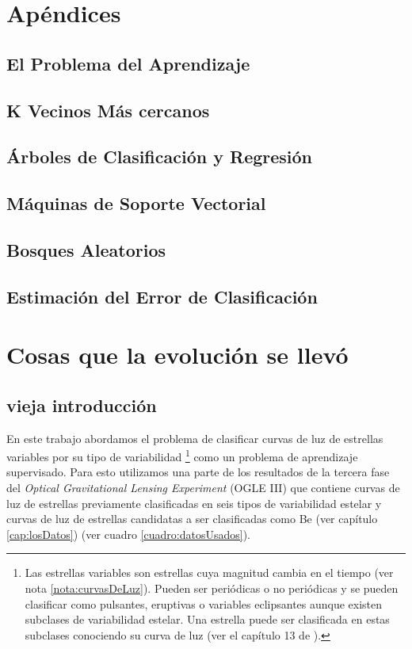 \documentclass[letterpaper,12pt]{book}
\begin{document}
\chapter{Apéndices}

\section{El Problema del Aprendizaje\label{cap:problemaAprendizaje}}

\section{K Vecinos Más cercanos}

\section{Árboles de Clasificación y Regresión}

\section{Máquinas de Soporte Vectorial}

\section{Bosques Aleatorios}

\section{Estimación del Error de Clasificación}\label{sec:estimacionError}


\chapter{Cosas que la evolución se llevó}

\section{vieja introducción}
En este trabajo abordamos el problema de clasificar curvas de luz de estrellas variables por su tipo de variabilidad \footnote{Las estrellas variables son estrellas cuya magnitud cambia en el tiempo (ver nota \ref{nota:curvasDeLuz}). Pueden ser periódicas o no periódicas y se pueden clasificar como pulsantes, eruptivas o variables eclipsantes aunque existen subclases de variabilidad estelar. Una estrella puede ser clasificada en estas subclases conociendo su curva de luz (ver el capítulo 13 de \cite{karttunen_fundamental_2007}).} como un problema de aprendizaje supervisado. Para esto utilizamos una parte de los resultados de la tercera fase del \textit{Optical Gravitational Lensing Experiment} (OGLE III) que contiene curvas de luz  de estrellas previamente clasificadas en seis tipos de variabilidad estelar y curvas de luz de estrellas candidatas a ser clasificadas como Be (ver capítulo \ref{cap:losDatos}) (ver cuadro \ref{cuadro:datosUsados}). 
\end{document}

